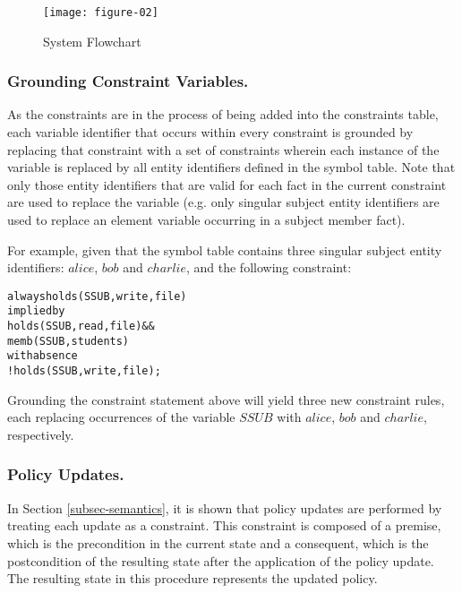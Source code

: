 \documentclass[global,twocolumn,final]{svjour}
\newenvironment{vverbatim}
  {\begin{alltt}}
  {\vspace{-\baselineskip}\end{alltt}}
\begin{document}
      \begin{figure}[ht]
        \begin{center}
          \texttt{[image: figure-02]}
          \caption{System Flowchart}
          \label{fig-2}
        \end{center}
      \end{figure}

      \subsubsection{Grounding Constraint Variables.}

        As the constraints are in the process of being added into the
        constraints table, each variable identifier that occurs within
        every constraint is grounded by replacing that constraint with a set of
        constraints wherein each instance of the variable is replaced by all
        entity identifiers defined in the symbol table. Note that only those
        entity identifiers that are valid for each fact in the current
        constraint are used to replace the variable (e.g. only singular
        subject entity identifiers are used to replace an element variable
        occurring in a subject member fact).

        For example, given that the symbol table contains three singular
        subject entity identifiers: $alice$, $bob$ and $charlie$, and the
        following constraint:

        \begin{vverbatim}
  always holds(SSUB, write, file)
    implied by
      holds(SSUB, read, file) &&
      memb(SSUB, students)
    with absence
      !holds(SSUB, write, file);
        \end{vverbatim}

        Grounding the constraint statement above will yield three new
        constraint rules, each replacing occurrences of the variable $SSUB$
        with $alice$, $bob$ and $charlie$, respectively.

      \subsubsection{Policy Updates.}

        In Section \ref{subsec-semantics}, it is shown that policy updates are
        performed by treating each update as a constraint. This constraint is
        composed of a premise, which is the precondition in the current state
        and a consequent, which is the postcondition of the resulting state
        after the application of the policy update. The resulting state in this
        procedure represents the updated policy.
\end{document}
